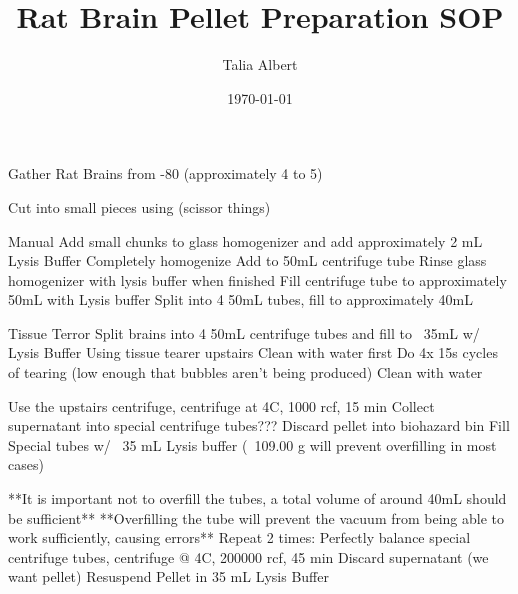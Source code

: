 \documentclass[12pt, letterpaper]{article}
\title{Rat Brain Pellet Preparation SOP}
\author{
    Talia Albert
}
\date{\today}
\begin{document}
\maketitle
\tableofcontents

Gather Rat Brains from -80 (approximately 4 to 5)

Cut into small pieces using (scissor things)

Manual
    Add small chunks to glass homogenizer and add approximately 2 mL Lysis Buffer
    Completely homogenize
    Add to 50mL centrifuge tube
    Rinse glass homogenizer with lysis buffer when finished
    Fill centrifuge tube to approximately 50mL with Lysis buffer
    Split into 4 50mL tubes, fill to approximately 40mL
    

Tissue Terror
    Split brains into 4 50mL centrifuge tubes and fill to ~35mL w/ Lysis Buffer
    Using tissue tearer upstairs
        Clean with water first
        Do 4x 15s cycles of tearing (low enough that bubbles aren't being produced)
        Clean with water


Use the upstairs centrifuge, centrifuge at 4C, 1000 rcf, 15 min
    Collect supernatant into special centrifuge tubes??? 
    Discard pellet into biohazard bin
    Fill Special tubes w/ ~35 mL Lysis buffer (~109.00 g will prevent overfilling in most cases)

    **It is important not to overfill the tubes, a total volume of around 40mL should be sufficient**
    **Overfilling the tube will prevent the vacuum from being able to work sufficiently, causing errors**
Repeat 2 times:
    Perfectly balance special centrifuge tubes, centrifuge @ 4C, 200000 rcf, 45 min
        Discard supernatant (we want pellet)
        Resuspend Pellet in 35 mL Lysis Buffer
\end{document}
